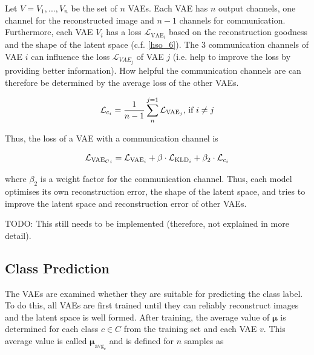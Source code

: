 Let $V = {V_1, ..., V_n}$ be the set of $n$ VAEs. Each VAE has $n$ output channels, one channel for the reconstructed image and $n-1$ channels for communication. Furthermore, each VAE $V_i$ has a loss $\mathcal{L}_{\text{VAE}_i}$ based on the reconstruction goodness and the shape of the latent space (c.f. \eqref{hso_6}). The $3$ communication channels of VAE $i$ can influence the loss $\mathcal{L}_{VAE_j}$ of VAE $j$ (i.e. help to improve the loss by providing better information). How helpful the communication channels are can therefore be determined by the average loss of the other VAEs.

\begin{equation}\eqlbl{hso_9}
	\mathcal{L}_{c_i} = \frac{1}{n-1} \sum_{n}^{j=1} \mathcal{L}_{\text{VAE}_j} \text{, if } i \neq j
\end{equation}

Thus, the loss of a VAE with a communication channel is

\begin{equation}\eqlbl{hso_10}
		\mathcal{L}_{{\text{VAE}_C}_i} = \mathcal{L}_{\text{VAE}_i} + \beta \cdot \mathcal{L}_{\text{KLD}_i} + \beta_2 \cdot \mathcal{L}_{c_i}
\end{equation}

where $\beta_2$ is a weight factor for the communication channel. Thus, each model optimises its own reconstruction error, the shape of the latent space, and tries to improve the latent space and reconstruction error of other VAEs.


TODO: This still needs to be implemented (therefore, not explained in more detail).

















\subsection{Class Prediction}
The VAEs are examined whether they are suitable for predicting the class label. To do this, all VAEs are first trained until they can reliably reconstruct images and the latent space is well formed.
After training, the average value of $\boldsymbol{\mu}$ is determined for each class $c \in C$ from the training set and each VAE $v$. This average value is called $\boldsymbol{\mu}_{\text{avg}_c}$ and is defined for $n$ samples as

